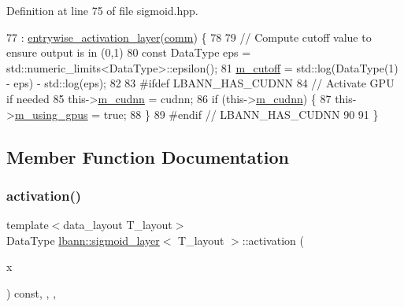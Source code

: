 Definition at line 75 of file sigmoid.\+hpp.


\begin{DoxyCode}
77     : \hyperlink{classlbann_1_1entrywise__activation__layer_aada1d9200612dcd13259799ef327c557}{entrywise\_activation\_layer}(\hyperlink{file__io_8cpp_ab048c6f9fcbcfaa57ce68b00263dbebe}{comm}) \{
78 
79     \textcolor{comment}{// Compute cutoff value to ensure output is in (0,1)}
80     \textcolor{keyword}{const} DataType eps = std::numeric\_limits<DataType>::epsilon();
81     \hyperlink{classlbann_1_1sigmoid__layer_ab4a50a9ae123aef61ff3f0c9c066bdff}{m\_cutoff} = std::log(DataType(1) - eps) - std::log(eps);
82 
83 \textcolor{preprocessor}{  #ifdef LBANN\_HAS\_CUDNN}
84     \textcolor{comment}{// Activate GPU if needed}
85     this->\hyperlink{classlbann_1_1Layer_a08dbb94239e3b8c96329786c57c72e21}{m\_cudnn} = cudnn;
86     \textcolor{keywordflow}{if} (this->\hyperlink{classlbann_1_1Layer_a08dbb94239e3b8c96329786c57c72e21}{m\_cudnn}) \{
87       this->\hyperlink{classlbann_1_1Layer_af7881cb5eff5207c15fa835d65462e8f}{m\_using\_gpus} = \textcolor{keyword}{true};
88     \}
89 \textcolor{preprocessor}{  #endif // LBANN\_HAS\_CUDNN}
90 
91   \}
\end{DoxyCode}


\subsection{Member Function Documentation}
\mbox{\label{classlbann_1_1sigmoid__layer_ab6a237e0a10be2599474dcd2cd73e767}} 
\subsubsection{\texorpdfstring{activation()}{activation()}}
{\footnotesize\ttfamily template$<$data\+\_\+layout T\+\_\+layout$>$ \\
Data\+Type \hyperlink{classlbann_1_1sigmoid__layer}{lbann\+::sigmoid\+\_\+layer}$<$ T\+\_\+layout $>$\+::activation (\begin{DoxyParamCaption}\item[{Data\+Type}]{x }\end{DoxyParamCaption}) const\hspace{0.3cm}{\ttfamily [inline]}, {\ttfamily [override]}, {\ttfamily [protected]}, {\ttfamily [virtual]}}

